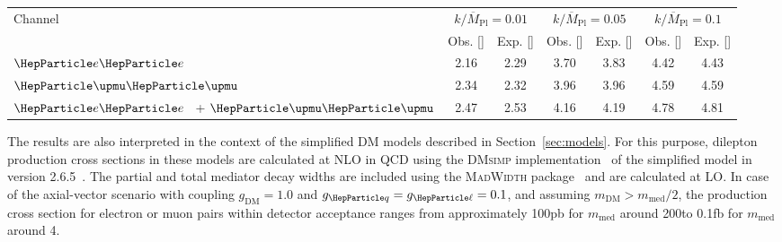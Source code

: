 \documentclass[11pt,twoside,a4paper,cmspaper,final,collab]{cms-tdr}
\begin{document}
\begin{table}[!hbt]
\centering
{}
\begin{tabular}{lcccccc}
\hline
\multirow{2}{*}{Channel}  & \multicolumn{2}{c}{$k/\overline{M}_\mathrm{Pl} = 0.01$} & \multicolumn{2}{c}{$k/\overline{M}_\mathrm{Pl} = 0.05$}  & \multicolumn{2}{c}{$k/\overline{M}_\mathrm{Pl} = 0.1$}\\
                          & Obs. [\TeVns{}] & Exp. [\TeVns{}]      & Obs. [\TeVns{}]  & Exp. [\TeVns{}]   & Obs. [\TeVns{}]  & Exp. [\TeVns{}]      \\\hline
$\Pe\Pe$                    &  2.16      & 2.29            & 3.70        & 3.83   & 4.42  & 4.43       \\
$\PGm\PGm$             &  2.34      & 2.32            & 3.96        & 3.96   & 4.59  & 4.59        \\
$\Pe\Pe$ ~+ $\PGm\PGm$    &  2.47     & 2.53            & 4.16        & 4.19   & 4.78  & 4.81        \\
\hline
\end{tabular}
\label{tab:massLimitsSpin2}
\end{table}

The results are also interpreted in the context of the simplified DM models described in Section~\ref{sec:models}. For this purpose, dilepton production cross sections in these models are calculated at NLO in QCD using the \textsc{DMsimp} implementation~\cite{Backovic:2015soa} of the simplified model in \MGvATNLO version 2.6.5~\cite{Alwall:2014hca}. The partial and total mediator decay widths are included using the \textsc{MadWidth} package~\cite{Alwall:2014bza} and are calculated at LO. In case of the axial-vector scenario with coupling $g_\text{DM}=1.0$ and $g_{\PQq}=g_{\Pell}=0.1$, and assuming $m_\text{DM} > m_{\text{med}}/2$, the production cross section for electron or muon pairs within detector acceptance ranges from approximately 100\unit{pb} for $m_{\text{med}}$ around 200\GeV to 0.1\unit{fb} for $m_{\text{med}}$ around 4\TeV.
\end{document}
